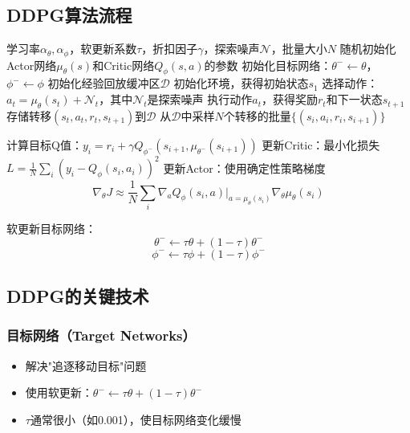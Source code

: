 \subsection{DDPG算法流程}

\begin{algorithm}[H]
\caption{DDPG算法}
\begin{algorithmic}[1]
\REQUIRE 学习率$\alpha_\theta, \alpha_\phi$，软更新系数$\tau$，折扣因子$\gamma$，探索噪声$\mathcal{N}$，批量大小$N$
\STATE 随机初始化Actor网络$\mu_\theta(s)$和Critic网络$Q_\phi(s,a)$的参数
\STATE 初始化目标网络：$\theta^- \leftarrow \theta$，$\phi^- \leftarrow \phi$
\STATE 初始化经验回放缓冲区$\mathcal{D}$
    \STATE 初始化环境，获得初始状态$s_1$
        \STATE 选择动作：$a_t = \mu_\theta(s_t) + \mathcal{N}_t$，其中$\mathcal{N}_t$是探索噪声
        \STATE 执行动作$a_t$，获得奖励$r_t$和下一状态$s_{t+1}$
        \STATE 存储转移$(s_t, a_t, r_t, s_{t+1})$到$\mathcal{D}$
        \STATE 从$\mathcal{D}$中采样$N$个转移的批量$\{(s_i, a_i, r_i, s_{i+1})\}$
        
        \STATE 计算目标Q值：$y_i = r_i + \gamma Q_{\phi^-}(s_{i+1}, \mu_{\theta^-}(s_{i+1}))$
        \STATE 更新Critic：最小化损失$L = \frac{1}{N}\sum_i (y_i - Q_\phi(s_i, a_i))^2$
        \STATE 更新Actor：使用确定性策略梯度
        \[
        \nabla_\theta J \approx \frac{1}{N}\sum_i \nabla_a Q_\phi(s_i, a)|_{a=\mu_\theta(s_i)} \nabla_\theta \mu_\theta(s_i)
        \]
        
        \STATE 软更新目标网络：
        \[
        \theta^- \leftarrow \tau\theta + (1-\tau)\theta^-
        \]
        \[
        \phi^- \leftarrow \tau\phi + (1-\tau)\phi^-
        \]
    \ENDFOR
\ENDFOR
\end{algorithmic}
\end{algorithm}

\subsection{DDPG的关键技术}

\subsubsection{目标网络（Target Networks）}
\begin{itemize}
    \item 解决"追逐移动目标"问题
    \item 使用软更新：$\theta^- \leftarrow \tau\theta + (1-\tau)\theta^-$
    \item $\tau$通常很小（如0.001），使目标网络变化缓慢
\end{itemize}

